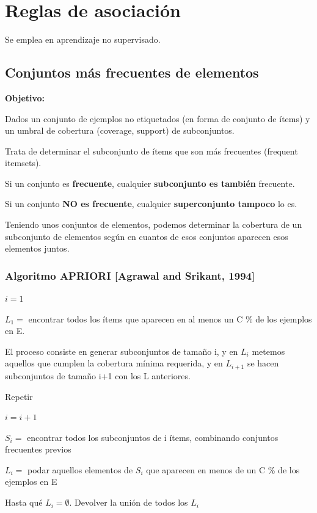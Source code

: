 \documentclass[12pt, twoside, openright]{report} %
\begin{document}
\section{Reglas de asociación}
Se emplea en aprendizaje no supervisado.

\subsection{Conjuntos más frecuentes de elementos}
\textbf{Objetivo:} 

Dados un conjunto de ejemplos no etiquetados (en forma de conjunto de ítems) y un umbral de cobertura (coverage, support) de subconjuntos. 

Trata de determinar el subconjunto de ítems que son más frecuentes (frequent itemsets).

Si un conjunto es \textbf{frecuente}, cualquier \textbf{subconjunto es también} frecuente.

Si un conjunto \textbf{NO es frecuente}, cualquier \textbf{superconjunto tampoco} lo es.

Teniendo unos conjuntos de elementos, podemos determinar la cobertura de un subconjunto de elementos según en cuantos de esos conjuntos aparecen esos elementos juntos.

\subsubsection{Algoritmo APRIORI [Agrawal and Srikant, 1994]}

$i = 1$

$L_1 =$ encontrar todos los ítems que aparecen en al menos un C \% de los ejemplos en E.

El proceso consiste en generar subconjuntos de tamaño i, y en $L_i$ metemos aquellos que cumplen la cobertura mínima requerida, y en $L_{i+1}$ se hacen subconjuntos de tamaño i+1 con los L anteriores.

Repetir

\hspace{6mm} $i = i + 1$

\hspace{6mm} $S_i =$ encontrar todos los subconjuntos de i ítems, combinando conjuntos frecuentes previos

\hspace{6mm} $L_i =$ podar aquellos elementos de $S_i$ que aparecen en menos de un C \% de los ejemplos en E

Hasta qué $L_i = \emptyset$. Devolver la unión de todos los $L_i$
\end{document}
